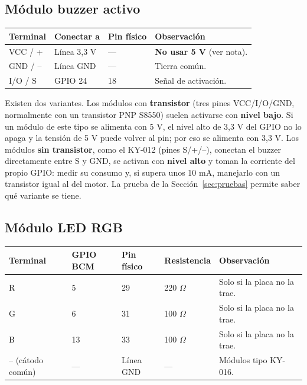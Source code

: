 \documentclass[11pt,a4paper]{article}
\begin{document}
\subsection{Módulo buzzer activo}

\begin{center}
\begin{tabularx}{\linewidth}{lllX}
\toprule
\textbf{Terminal} & \textbf{Conectar a} & \textbf{Pin físico} & \textbf{Observación}\\
\midrule
VCC / + & Línea 3,3 V & --- & \textbf{No usar 5 V} (ver nota).\\
GND / -- & Línea GND & --- & Tierra común.\\
I/O / S & GPIO 24 & 18 & Señal de activación.\\
\bottomrule
\end{tabularx}
\end{center}

Existen dos variantes. Los módulos con \textbf{transistor} (tres pines
VCC/I/O/GND, normalmente con un transistor PNP S8550) suelen activarse con
\textbf{nivel bajo}. Si un módulo de este tipo se alimenta con 5 V, el nivel
alto de 3,3 V del GPIO no lo apaga y la tensión de 5 V puede volver al pin; por
eso se alimenta con 3,3 V. Los módulos \textbf{sin transistor}, como el KY-012
(pines S/+/--), conectan el buzzer directamente entre S y GND, se activan con
\textbf{nivel alto} y toman la corriente del propio GPIO: medir su consumo y,
si supera unos 10 mA, manejarlo con un transistor igual al del motor. La prueba
de la Sección~\ref{sec:pruebas} permite saber qué variante se tiene.

\subsection{Módulo LED RGB}

\begin{center}
\begin{tabularx}{\linewidth}{llllX}
\toprule
\textbf{Terminal} & \textbf{GPIO BCM} & \textbf{Pin físico} & \textbf{Resistencia} & \textbf{Observación}\\
\midrule
R & 5 & 29 & 220 $\Omega$ & Solo si la placa no la trae.\\
G & 6 & 31 & 100 $\Omega$ & Solo si la placa no la trae.\\
B & 13 & 33 & 100 $\Omega$ & Solo si la placa no la trae.\\
-- (cátodo común) & --- & Línea GND & --- & Módulos tipo KY-016.\\
\bottomrule
\end{tabularx}
\end{center}
\end{document}
